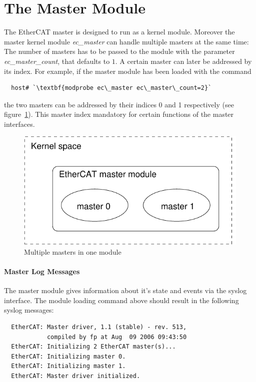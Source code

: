 \documentclass[a4paper,12pt,BCOR6mm,bibtotoc,idxtotoc]{scrbook}
\begin{document}

\section{The Master Module}
\label{sec:mastermod}

The EtherCAT master is designed to run as a kernel module. Moreover
the master kernel module \textit{ec\_master} can handle multiple
masters at the same time: The number of masters has to be passed to
the module with the parameter \textit{ec\_master\_count}, that
defaults to $1$. A certain master can later be addressed by its index.
For example, if the master module has been loaded with the command

\begin{lstlisting}
  host# `\textbf{modprobe ec\_master ec\_master\_count=2}`
\end{lstlisting}

the two masters can be addressed by their indices 0 and 1 respectively
(see figure~\ref{fig:masters}). This master index mandatory for
certain functions of the master interfaces.

\begin{figure}[htbp]
  \centering
  \includegraphics[width=.5\textwidth]{images/masters}
  \caption{Multiple masters in one module}
  \label{fig:masters}
\end{figure}

\paragraph{Master Log Messages}

The master module gives information about it's state and events via
the syslog interface. The module loading command above should result
in the following syslog messages:

\begin{lstlisting}
  EtherCAT: Master driver, 1.1 (stable) - rev. 513,
            compiled by fp at Aug  09 2006 09:43:50
  EtherCAT: Initializing 2 EtherCAT master(s)...
  EtherCAT: Initializing master 0.
  EtherCAT: Initializing master 1.
  EtherCAT: Master driver initialized.
\end{lstlisting}
\end{document}
